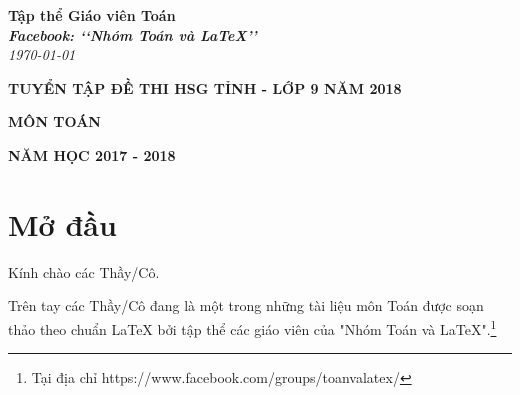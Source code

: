 \documentclass[12pt,a4paper,oneside]{book}
\renewcommand{\baselinestretch}{1.4}
\theoremstyle{nonumberplain}
\numberwithin{equation}{section}
\renewcommand{\baselinestretch}{1.4}
\begin{document}
	\providecommand*{\dx}{\ensuremath{\mathrm{\,d}}x}
	\providecommand*{\unit}[1]{\ensuremath{\mathrm{\,#1}}}
	
	\begin{titlepage}
		\begin{flushright}
			\fontsize{17}{0}\selectfont
			\textbf{Tập thể Giáo viên Toán}\\
			\textbf{\textit{Facebook: \lq\lq Nhóm Toán và LaTeX\rq\rq}}\\
			\textit{\color{red}\today}
		\end{flushright}
		
		\vspace{4cm}
		
		\begin{flushright}
			
			\vspace{1cm}
			
			\textbf{\fontsize{20}{0}\selectfont T\fontsize{15}{0}\selectfont UYỂN TẬP ĐỀ THI HSG TỈNH - LỚP 9 NĂM 2018}
			
			\vspace{1cm}
			
			\textbf{\fontsize{35}{0}\selectfont MÔN TOÁN}
		\end{flushright}
		
		\vfill{
			\begin{flushright}
				\fontsize{17}{0}\textbf{NĂM HỌC 2017 - 2018}
			\end{flushright}
		}
	\end{titlepage}
	\pagestyle{empty}
	\renewcommand{\headrulewidth}{0.4pt}
	
	{\renewcommand{\baselinestretch}{1.3}
		\tableofcontents
	}
	
	\pagestyle{fancy}
	\lhead{\empty}
	\rhead{\empty}
	\lfoot{\currfilename}
	\chapter*{Mở đầu}
	Kính chào các Thầy/Cô.
	
	\vspace{0.6cm}
	
	\noindent Trên tay các Thầy/Cô đang là một trong những tài liệu môn Toán được soạn thảo theo chuẩn \LaTeX{} bởi tập thể các giáo viên của "Nhóm Toán và LaTeX".\footnote{Tại địa chỉ https://www.facebook.com/groups/toanvalatex/}
	
	\vspace{0.6cm}
	
\end{document}
